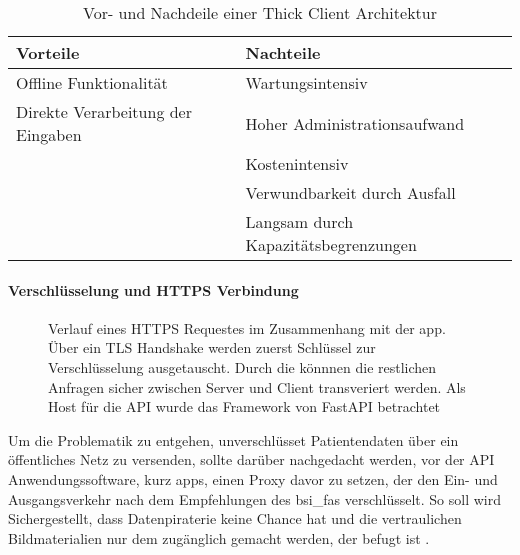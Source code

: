 \begin{table}[t]\vspace{1ex}\centering
  \begin{tabular*}{14cm}{l|l}
  \textbf{Vorteile} & \textbf{Nachteile}
  \\\hline\hline
  Offline Funktionalität             &  Wartungsintensiv               \\
  Direkte Verarbeitung der Eingaben  &  Hoher Administrationsaufwand   \\
                                     &  Kostenintensiv                 \\
                                     &  Verwundbarkeit durch Ausfall   \\
                                     &  Langsam durch Kapazitätsbegrenzungen
  \\\hline
  \end{tabular*}
  \caption[Vor- und Nachteile von Thick Client]{Vor- und Nachdeile einer Thick Client Architektur}\label{cap:thickclient}
\vspace{1ex}\end{table}\label{table:thickclient}


\paragraph{Verschlüsselung und HTTPS Verbindung}\label{encryption}
\begin{figure}[t]
\begin{center}
 
\caption[FastAPI HTTPS Request Verlauf]{Verlauf eines HTTPS Requestes im Zusammenhang mit der \ac{app}. Über ein TLS Handshake werden zuerst Schlüssel zur Verschlüsselung ausgetauscht. Durch die könnnen die restlichen Anfragen sicher zwischen Server und Client transveriert werden. Als Host für die API wurde das Framework von FastAPI betrachtet \cite{fastapi}}\label{cap:fastapi}
\end{center}
\end{figure}\label{fig:fastapi}

Um die Problematik zu entgehen, unverschlüsset Patientendaten über ein öffentliches Netz zu versenden, sollte darüber nachgedacht werden, vor der API Anwendungssoftware, kurz \Acp{app}, einen Proxy davor zu setzen, der den Ein- und Ausgangsverkehr nach dem Empfehlungen des \Acp{bsi_fa} verschlüsselt. So soll wird Sichergestellt, dass Datenpiraterie keine Chance hat und die vertraulichen Bildmaterialien nur dem zugänglich gemacht werden, der befugt ist \cite{fastapi} \cite{bsi}.

